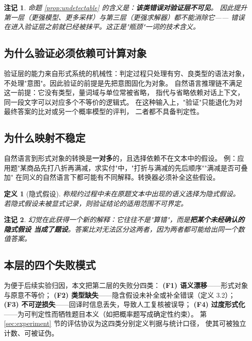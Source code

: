 \documentclass[11pt]{article}
\newtheorem{definition}{定义}[section]
\newtheorem{remark}{注记}[section]
\begin{document}
\begin{remark}
命题 \ref{prop:undetectable} 的含义是：\textbf{该类错误对验证层不可见}。
因此提升第一层（更强模型、更多采样）与第三层（更强求解器）都不能消除它——
错误在进入验证层之前就已经被抹平。这正是"瓶颈"一词的技术含义。
\end{remark}

\subsection{为什么验证必须依赖可计算对象}
验证层的能力来自形式系统的机械性：判定过程只处理有穷、良类型的语法对象，
不处理"意图"。因此验证的前提是先把意图固化为对象。
自然语言推理链不满足这一前提：它没有类型，量词域与单位常被省略，
指代与省略依赖对话上下文，同一段文字可以对应多个不等价的逻辑式。
在这种输入上，"验证"只能退化为对最终答案的比对或另一个概率模型的评判，
二者都不具备判定性。

\subsection{为什么映射不稳定}
自然语言到形式对象的转换是\textbf{一对多}的，且选择依赖不在文本中的假设。
例：应用题"某商品先打八折再满减，求实付"中，"打折与满减的先后顺序""满减是否可叠加"
在同义的自然语言下都可能有不同解释。转换器必须补全这些假设。

\begin{definition}[隐式假设]
称规约过程中未在原题文本中出现的语义选择为\emph{隐式假设}。
若隐式假设未被显式记录，则验证结论的适用范围不可界定。
\end{definition}

\begin{remark}
幻觉在此获得一个新的解释：它往往不是"算错"，而是\textbf{把某个未经确认的隐式假设
当成了题设}。答案比对无法区分这两者，因为两者都可能给出同一个数值答案。
\end{remark}

\subsection{本层的四个失败模式}
为便于后续实验归因，本文把第二层的失败分四类：
\textbf{(F1) 语义漂移}——形式对象与原意不等价；
\textbf{(F2) 类型缺失}——隐含假设未补全或补全错误（定义 3.2）；
\textbf{(F3) 不可逆损失}——回译时信息丢失，导致人工复核被误导；
\textbf{(F4) 过度形式化}——为可判定性而牺牲题目本义（如把概率题写成确定性约束）。
第 \ref{sec:experiment} 节的评估协议为这四类分别定义判据与统计口径，
使其可被独立计数、可被证伪。
\end{document}
